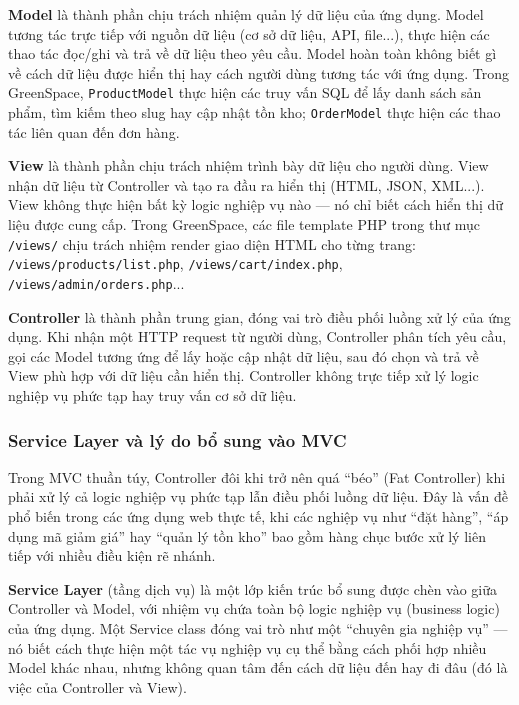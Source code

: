 \documentclass[11pt, a4paper]{article}
\begin{document}
\textbf{Model} là thành phần chịu trách nhiệm quản lý dữ liệu của ứng dụng. Model tương tác trực tiếp với nguồn dữ liệu (cơ sở dữ liệu, API, file...), thực hiện các thao tác đọc/ghi và trả về dữ liệu theo yêu cầu. Model hoàn toàn không biết gì về cách dữ liệu được hiển thị hay cách người dùng tương tác với ứng dụng. Trong GreenSpace, \texttt{ProductModel} thực hiện các truy vấn SQL để lấy danh sách sản phẩm, tìm kiếm theo slug hay cập nhật tồn kho; \texttt{OrderModel} thực hiện các thao tác liên quan đến đơn hàng.

\textbf{View} là thành phần chịu trách nhiệm trình bày dữ liệu cho người dùng. View nhận dữ liệu từ Controller và tạo ra đầu ra hiển thị (HTML, JSON, XML...). View không thực hiện bất kỳ logic nghiệp vụ nào --- nó chỉ biết cách hiển thị dữ liệu được cung cấp. Trong GreenSpace, các file template PHP trong thư mục \texttt{/views/} chịu trách nhiệm render giao diện HTML cho từng trang: \texttt{/views/products/list.php}, \texttt{/views/cart/index.php}, \texttt{/views/admin/orders.php}...

\textbf{Controller} là thành phần trung gian, đóng vai trò điều phối luồng xử lý của ứng dụng. Khi nhận một HTTP request từ người dùng, Controller phân tích yêu cầu, gọi các Model tương ứng để lấy hoặc cập nhật dữ liệu, sau đó chọn và trả về View phù hợp với dữ liệu cần hiển thị. Controller không trực tiếp xử lý logic nghiệp vụ phức tạp hay truy vấn cơ sở dữ liệu.

\subsubsection{Service Layer và lý do bổ sung vào MVC}

Trong MVC thuần túy, Controller đôi khi trở nên quá ``béo'' (Fat Controller) khi phải xử lý cả logic nghiệp vụ phức tạp lẫn điều phối luồng dữ liệu. Đây là vấn đề phổ biến trong các ứng dụng web thực tế, khi các nghiệp vụ như ``đặt hàng'', ``áp dụng mã giảm giá'' hay ``quản lý tồn kho'' bao gồm hàng chục bước xử lý liên tiếp với nhiều điều kiện rẽ nhánh.

\textbf{Service Layer} (tầng dịch vụ) là một lớp kiến trúc bổ sung được chèn vào giữa Controller và Model, với nhiệm vụ chứa toàn bộ logic nghiệp vụ (business logic) của ứng dụng. Một Service class đóng vai trò như một ``chuyên gia nghiệp vụ'' --- nó biết cách thực hiện một tác vụ nghiệp vụ cụ thể bằng cách phối hợp nhiều Model khác nhau, nhưng không quan tâm đến cách dữ liệu đến hay đi đâu (đó là việc của Controller và View).
\end{document}
